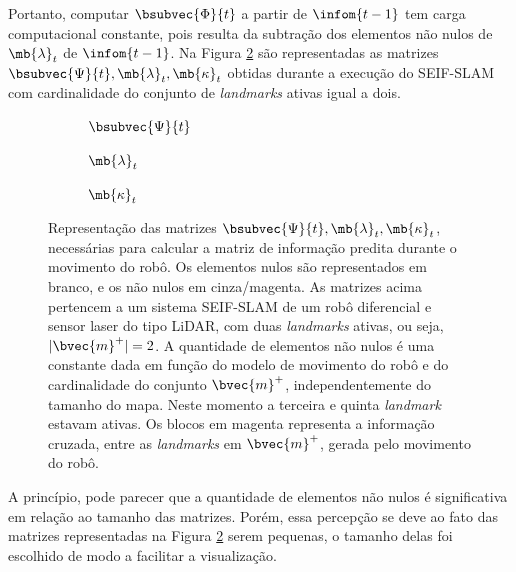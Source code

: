 Portanto, computar $\bsubvec{\Phi}{t}$ a partir de $\infom{t-1}$
tem carga computacional constante, pois resulta da subtração dos elementos não nulos 
de $\mb{\lambda}_t$ de $\infom{t-1}$. Na Figura 
\ref{fig:seif-slam-prediction-variables} são representadas as matrizes $\bsubvec{\Psi}{t}, \mb{\lambda}_t, \mb{\kappa}_t$ obtidas durante a 
execução do SEIF-SLAM com cardinalidade do conjunto de \textit{landmarks} ativas 
igual a dois. 
\begin{figure}[h]
  \begin{subfigure}{.30\textwidth}
    
    \caption{$\bsubvec{\Psi}{t}$}
  \end{subfigure}
  \hfill
  \begin{subfigure}{.30\textwidth}
    
    \caption{$\mb{\lambda}_t$}
  \end{subfigure}
  \hfill
  \begin{subfigure}{.30\textwidth}
    
    \caption{$\mb{\kappa}_{t}$}
    \label{fig:seif-slam-kappa}
  \end{subfigure}
  \caption{Representação das matrizes $\bsubvec{\Psi}{t}, \mb{\lambda}_t, \mb{\kappa}_t$, necessárias para calcular a 
  matriz de informação predita durante o movimento do robô. Os elementos 
  nulos são representados em branco, e os não nulos em cinza/magenta. 
  As matrizes acima 
  pertencem a um sistema SEIF-SLAM de um robô diferencial e 
  sensor laser do tipo LiDAR, com duas \textit{landmarks} ativas, ou seja, $\lvert \bvec{m}^+ \rvert = 2$. A quantidade de elementos não nulos 
  é uma constante dada em função do modelo de movimento do robô e do cardinalidade do conjunto $\bvec{m}^+$, independentemente do tamanho do mapa. Neste momento a terceira e quinta \textit{landmark} estavam ativas. 
  Os blocos em magenta representa a informação cruzada, entre as \textit{landmarks} em $\bvec{m}^+$, gerada pelo movimento do robô.}
  \label{fig:seif-slam-prediction-variables}
\end{figure}

A princípio, pode parecer que a quantidade de elementos não 
nulos é significativa em relação ao tamanho das matrizes. Porém, essa 
percepção se deve ao fato das matrizes representadas na Figura \ref{fig:seif-slam-prediction-variables} serem pequenas, o tamanho delas foi escolhido de modo a facilitar a visualização.

